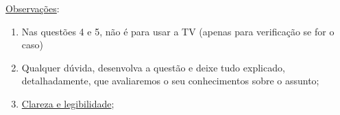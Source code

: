 \documentclass[12pt]{article}
\begin{document}
\begin{enumerate}
{\begin{flushleft}
\underline{Observações}:
\begin{enumerate}
\setlength{\itemsep}{-2pt}

\item Nas questões 4 e 5, não é para usar a TV (apenas para verificação se for o caso)

\item Qualquer dúvida, desenvolva a questão e deixe tudo
explicado, detalhadamente, que avaliaremos o seu conhecimentos sobre
 o assunto;

 \item \underline{Clareza e legibilidade};

\end{enumerate}
\end{flushleft}
}

\end{enumerate}
\end{document}
